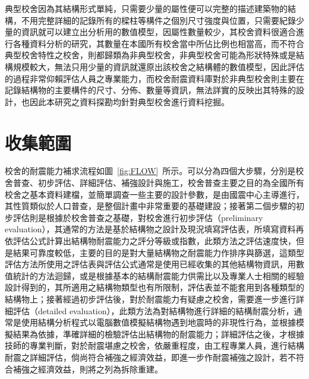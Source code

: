 典型校舍因為其結構形式單純，只需要少量的屬性便可以完整的描述建築物的結構，不用完整詳細的記錄所有的樑柱等構件之個別尺寸強度與位置，只需要紀錄少量的資訊就可以建立出分析用的數值模型，因屬性數量較少，其校舍資料很適合進行各種資料分析的研究，其數量在本國所有校舍當中所佔比例也相當高，而不符合典型校舍特性之校舍，則都歸類為非典型校舍，非典型校舍可能為形狀特殊或是結構規模較大，無法只用少量的資訊就還原出該校舍之結構體的數值模型，因此評估的過程非常仰賴評估人員之專業能力，而校舍耐震資料庫對於非典型校舍則主要在記錄結構物的主要構件的尺寸、分佈、數量等資訊，無法詳實的反映出其特殊的設計，也因此本研究之資料探勘均針對典型校舍進行資料挖掘。

\section{收集範圍}

校舍的耐震能力補求流程如圖~\ref{fig:FLOW}~所示。可以分為四個大步驟，分別是校舍普查、初步評估、詳細評估、補強設計與施工，校舍普查主要之目的為全國所有校舍之基本資料建檔，並簡單調查一些主要的設計參數，是由國震中心主導進行，其性質類似於人口普查，是整個計畫中非常重要的基礎建設；接著第二個步驟的初步評估則是根據於校舍普查之基礎，對校舍進行初步評估（preliminary evaluation），其通常的方法是基於結構物之設計及現況填寫評估表，所填寫資料再依評估公式計算出結構物耐震能力之評分等級或指數，此類方法之評估速度快，但是結果可靠度較低，主要的目的是對大量結構物之耐震能力作排序與篩選，這類型評估方法所使用之評估表與評估公式通常是使用已經收集的其他結構物資訊，用數值統計的方法迴歸，或是根據基本的結構耐震能力供需比以及專業人士相關的經驗設計得到的，其所適用之結構物類型也有所限制，評估表並不能套用到各種類型的結構物上；接著經過初步評估後，對於耐震能力有疑慮之校舍，需要進一步進行詳細評估（detailed evaluation），此類方法為對結構物進行詳細的結構耐震分析，通常是使用結構分析程式以電腦數值模擬結構物遇到地震時的非現性行為，並根據模擬結果為依據，準確詳細的檢驗評估出結構物的耐震能力；詳細評估之後，才根據技師的專業判斷，對於耐震堪慮之校舍，依嚴重程度，由工程專業人員，進行結構耐震之詳細評估，倘尚符合補強之經濟效益，即進一步作耐震補強之設計，若不符合補強之經濟效益，則將之列為拆除重建。


